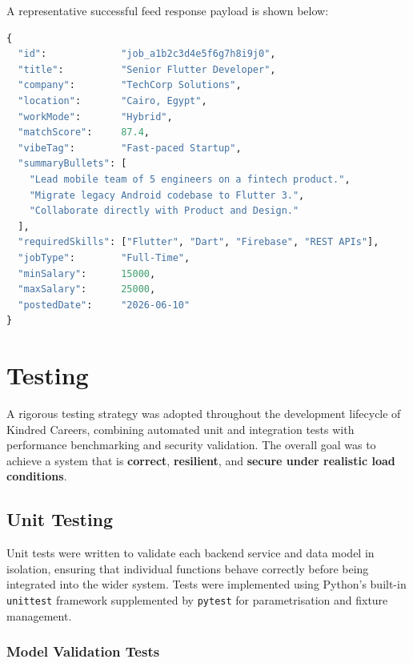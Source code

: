 \documentclass[12pt, a4paper, oneside]{report}
\begin{document}
\noindent A representative successful feed response payload is shown below:

\begin{lstlisting}[language=Python, caption={Sample \texttt{/api/jobs/feed} response object.}]
{
  "id":             "job_a1b2c3d4e5f6g7h8i9j0",
  "title":          "Senior Flutter Developer",
  "company":        "TechCorp Solutions",
  "location":       "Cairo, Egypt",
  "workMode":       "Hybrid",
  "matchScore":     87.4,
  "vibeTag":        "Fast-paced Startup",
  "summaryBullets": [
    "Lead mobile team of 5 engineers on a fintech product.",
    "Migrate legacy Android codebase to Flutter 3.",
    "Collaborate directly with Product and Design."
  ],
  "requiredSkills": ["Flutter", "Dart", "Firebase", "REST APIs"],
  "jobType":        "Full-Time",
  "minSalary":      15000,
  "maxSalary":      25000,
  "postedDate":     "2026-06-10"
}
\end{lstlisting}

\chapter{Testing}

A rigorous testing strategy was adopted throughout the development lifecycle of Kindred
Careers, combining automated unit and integration tests with performance benchmarking and
security validation. The overall goal was to achieve a system that is \textbf{correct},
\textbf{resilient}, and \textbf{secure under realistic load conditions}.

\section{Unit Testing}
\label{sec:unit-testing}

Unit tests were written to validate each backend service and data model in isolation,
ensuring that individual functions behave correctly before being integrated into the wider
system. Tests were implemented using Python's built-in \texttt{unittest} framework
supplemented by \texttt{pytest} for parametrisation and fixture management.

\subsection*{Model Validation Tests}
\end{document}
